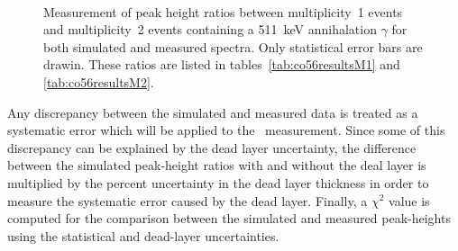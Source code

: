 \documentclass[/main.tex]{subfiles}
\begin{document}
\begin{figure}[p]
  \centering
  \\
  \caption[Peak height ratio comparison results for module 1 and module 2]{\label{fig:co56results}
    Measurement of peak height ratios between multiplicity~1 events and multiplicity~2 events containing a 511~keV annihalation $\gamma$ for both simulated and measured  spectra. Only statistical error bars are drawin. These ratios are listed in tables~\ref{tab:co56resultsM1} and \ref{tab:co56resultsM2}.
  }
\end{figure}
Any discrepancy between the simulated and measured data is treated as a systematic error which will be applied to the \bbes\ measurement.
Since some of this discrepancy can be explained by the dead layer uncertainty, the difference between the simulated peak-height ratios with and without the deal layer is multiplied by the percent uncertainty in the dead layer thickness in order to measure the systematic error caused by the dead layer.
Finally, a $\chi^2$ value is computed for the comparison between the simulated and measured peak-heights using the statistical and dead-layer uncertainties.
\end{document}
